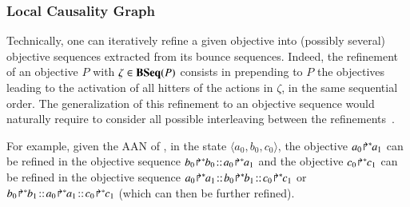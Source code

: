 \subsubsection{Local Causality Graph}


Technically,
one can iteratively refine a given objective into (possibly several) objective
sequences extracted from its bounce sequences.
Indeed, the refinement of an objective $P$ with $\zeta\in\mathbf{BSeq}(P)$
consists in prepending to $P$ the
objectives leading to the activation of all hitters of the actions in $\zeta$,
in the same sequential order.
The generalization of this refinement to an objective sequence would
naturally require to consider all possible
interleaving between the refinements~\cite{PMR12-MSCS}.

For example, given the AAN of ,
in the state $\langle a_0,b_0,c_0\rangle$,
the objective ${a_0\!\Rsh^*\!\!a_1}$ can be refined in the objective sequence
$\obj{b_0}{b_0}\concat\obj{a_0}{a_1}$
and
the objective ${c_0\!\Rsh^*\!\!c_1}$ can be refined in the objective sequence
$\obj{a_0}{a_1}\concat\obj{b_0}{b_1}\concat\obj{c_0}{c_1}$
or
$\obj{b_0}{b_1}\concat\obj{a_0}{a_1}\concat\obj{c_0}{c_1}$
(which can then be further refined).

\medskip


